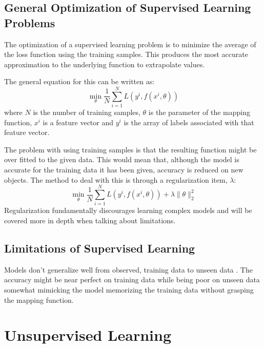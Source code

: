 \documentclass[10pt,a4paper]{report}
\begin{document}
		\section{General Optimization of Supervised Learning Problems}
			The optimization of a supervised learning problem is to minimize the average of the loss function using the training samples. This produces the
			most accurate approximation to the underlying function to extrapolate values. \par
			The general equation \autocite[p. 3]{SurveyOfOptimizationMethods} for this can be written as:
			\begin{equation}
				\min_\theta \frac{1}{N} \sum_{i=1}^{N} L(y^i, f(x^i,\theta))
				\label{eq:supervised-learning-general}
			\end{equation}
			where $N$ is the number of training samples, $\theta$ is the parameter of the mapping function, $x^i$ is a feature vector
			and $y^i$ is the array of labels associated with that feature vector. \par
			The problem with using training samples is that the resulting function might be over fitted to the given data. This would mean
			that, although the model is accurate for the training data it has been given, accuracy is reduced on new objects. The method to
			deal with this is through a regularization item, $\lambda$:
			\begin{equation}
				\min_\theta \frac{1}{N} \sum_{i=1}^{N} L(y^i, f(x^i,\theta)) + \lambda\| \theta\|_{2}^{2}
				\label{eq:supervised-learning-regularization}
			\end{equation}
			Regularization fundamentally discourages learning complex models and will be covered more in depth when talking about limitations.

		\section{Limitations of Supervised Learning}
			Models don't generalize well from observed, training data to unseen data \autocite{OverfittingSupervisedLearning}. The accuracy might be near perfect
			on training data while being poor on unseen data somewhat mimicking the model memorizing the training data without grasping the mapping function.






	\chapter{Unsupervised Learning}
\end{document}

